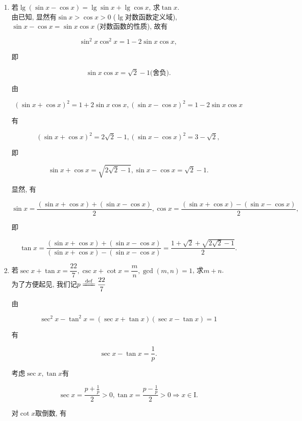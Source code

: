 \documentclass[8pt]{article}
\begin{document}
				\begin{enumerate}
					\item 若$\lg(\sin x-\cos x)=\lg\sin x + \lg\cos x$, 求$\tan x$.
						~\\

						由已知, 显然有\textcolor{allanyellow}{$\sin x > \cos x > 0$} ($\lg$对数函数定义域), \textcolor{allanred}{$\sin x - \cos x = \sin x \cos x$} (对数函数的性质), 故有

						$$\sin^2 x \cos^2 x = 1 - 2 \sin x \cos x,$$

						即

						$$\sin x \cos x = \sqrt{2}-1 \text{(舍负)}.$$

						由

						$$(\sin x + \cos x)^2 = 1 + 2\sin x \cos x, (\sin x - \cos x)^2 = 1 - 2\sin x\cos x$$

						有

						$$(\sin x + \cos x)^2 = 2 \sqrt{2} - 1, (\sin x - \cos x)^2 = 3 - \sqrt{2},$$

						即

						$$\sin x + \cos x = \sqrt{2\sqrt{2} - 1}, \sin x - \cos x = \sqrt{2} - 1.$$

						显然, 有

						$$\sin x = \frac{(\sin x + \cos x) + (\sin x - \cos x)}{2}, \cos x = \frac{(\sin x + \cos x) - (\sin x - \cos x)}{2},$$

						即

						$$\tan x = \frac{(\sin x + \cos x) + (\sin x - \cos x)}{(\sin x + \cos x) - (\sin x - \cos x)} = \frac{1+\sqrt{2} + \sqrt{2\sqrt{2}-1}}{2}.$$

					\item 若$\sec x + \tan x = \dfrac{22}{7}, \csc x + \cot x = \dfrac{m}{n}, \gcd(m, n)=1$, 求$m+n$.
						~\\

						为了方便起见, 我们记$p \ddef \dfrac{22}{7}$

						由

						$$\sec^2 x - \tan^2 x = (\sec x + \tan x)(\sec x - \tan x) = 1$$

						有

						$$\sec x - \tan x = \frac{1}{p}.$$

						考虑$\sec x, \tan x$有

						$$\sec x = \frac{p + \frac{1}{p}}{2} > 0, \tan x = \frac{p - \frac{1}{p}}{2} > 0 \Rightarrow x \in \mathrm{I}.$$

						对$\cot x$取倒数, 有


\end{enumerate}
\end{document}
